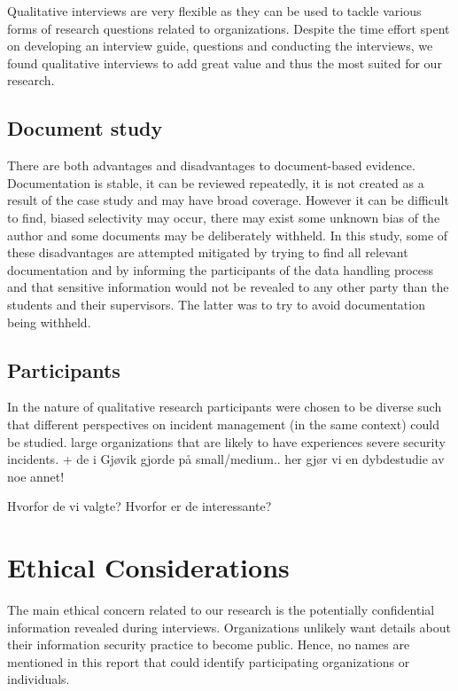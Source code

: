 Qualitative interviews are very flexible as they can be used to tackle various forms of research questions related to organizations. Despite the time effort spent on developing an interview guide, questions and conducting the interviews, we found qualitative interviews to add great value and thus the most suited for our research.

\subsection{Document study}
\label{sec:documentStudy}
There are both advantages and disadvantages to document-based evidence. Documentation is stable, it can be reviewed repeatedly, it is not created as a result of the case study and may have broad coverage. However it can be difficult to find, biased selectivity may occur, there may exist some unknown bias of the author and some documents may be deliberately withheld. In this study, some of these disadvantages are attempted mitigated by trying to find all relevant documentation and by informing the participants of the data handling process and that sensitive information would not be revealed to any other party than the students and their supervisors. The latter was to try to avoid documentation being withheld.  


\subsection{Participants}
In the nature of qualitative research participants were chosen to be diverse such that different perspectives on incident management (in the same context) could be studied.
large organizations that are likely to have experiences severe security incidents. + de i Gjøvik gjorde på small/medium.. her gjør vi en dybdestudie av noe annet!

Hvorfor de vi valgte? Hvorfor er de interessante?

\section{Ethical Considerations}
\label{sec:ethical}
The main ethical concern related to our research is the potentially confidential information revealed during interviews. Organizations unlikely want details about their information security practice to become public. Hence, no names are mentioned in this report that could identify participating organizations or individuals.


